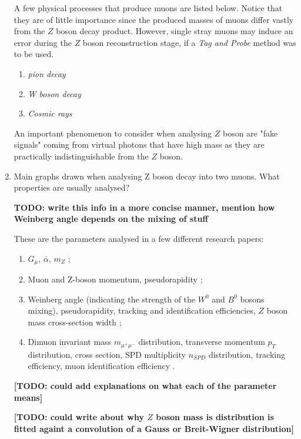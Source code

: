 \documentclass[11pt,a4paper,twoside]{article}
\begin{document}
\begin{enumerate}
        A few physical processes that produce muons are listed below. Notice that they are of little importance since the produced masses of muons differ vastly from the $Z$ boson decay product. However, single stray muons may induce an error during the $Z$ boson reconstruction stage, if a \textit{Tag and Probe} method was to be used.

        \begin{enumerate}
            \item \textit{pion decay}
            \item \textit{W boson decay}
            \item \textit{Cosmic rays}
        \end{enumerate}


        An important phenomenon to consider when analysing $Z$ boson are "fake signals" coming from virtual photons that have high mass as they are practically indistinguishable from the $Z$ boson.

        
        \item Main graphs drawn when analysing Z boson decay into two muons. What properties are usually analysed?

        \textbf{TODO: write this info in a more concise manner, mention how Weinberg angle depends on the mixing of stuff}

        These are the parameters analysed in a few different research papers:
        \begin{enumerate}
            \item $G_{\mu}$, $\bar{\alpha}$, $m_Z$ \cite{novikov1999theory};
            \item Muon and Z-boson momentum, pseudorapidity \cite{khodaverdian2019accuracy};
            \item Weinberg angle (indicating the strength of the $W^0$ and $B^0$ bosons mixing), pseudorapidity, tracking and identification efficiencies, $Z$ boson mass cross-section width \cite{ATLAS_Z_lab};
            \item Dimuon invariant mass $m_{\mu^{+} \mu^{-}}$ distribution, transverse momentum $p_T$ distribution, cross section, SPD multiplicity $n_{SPD}$ distribution, tracking efficiency, muon identification efficiency \cite{Bursche:2014ltl}.
        \end{enumerate}
        
        \textbf{[TODO: could add explanations on what each of the parameter means]}

        \textbf{[TODO: could write about why $Z$ boson mass is distribution is fitted againt a convolution of a Gauss or Breit-Wigner distribution]}



\end{enumerate}
\end{document}
